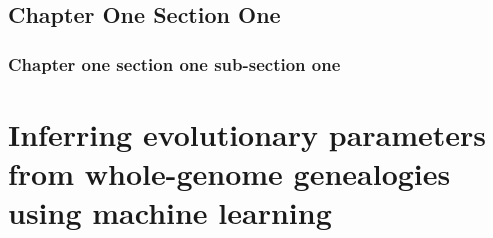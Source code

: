 






\section{Chapter One Section One}
\subsection{Chapter one section one sub-section one}

\chapter{Inferring evolutionary parameters from whole-genome genealogies using machine learning}






